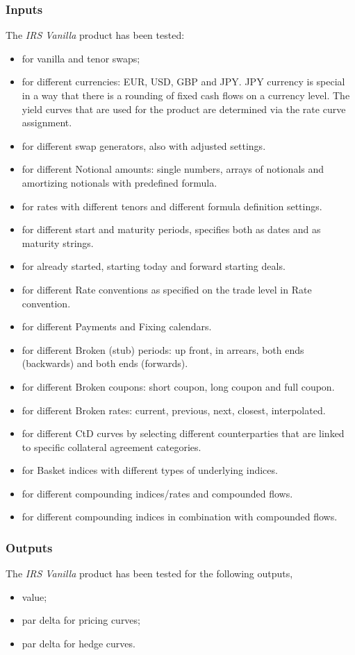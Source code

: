 \documentclass[]{pmv_report} %
\newcommand{\testsDone}{
    \begin{itemize}
        \item value;
        \item par delta for pricing curves;
        \item par delta for hedge curves.
    \end{itemize}
}
\begin{document}
\subsubsection{Inputs}
The \textit{IRS Vanilla} product has been tested:
\begin{itemize}
  \item for vanilla and tenor swaps;
  \item for different currencies: EUR, USD, GBP and JPY.
  JPY currency is special in a way that there is a rounding of fixed cash flows on a currency level.
  The yield curves that are used for the product are determined via the rate curve assignment.
  \item for different swap generators, also with adjusted settings.
  \item for different Notional amounts: single numbers, arrays of notionals and amortizing notionals with predefined formula.
  \item for \Libor rates with different tenors and different formula definition settings.
  \item for different start and maturity periods, specifies both as dates and as maturity strings.
  \item for already started, starting today and forward starting deals.
  \item for different Rate conventions as specified on the trade level in Rate convention.
  \item for different Payments and Fixing calendars.
  \item for different Broken (stub) periods: up front, in arrears, both ends (backwards) and both ends (forwards).
  \item for different Broken coupons: short coupon, long coupon and full coupon.
  \item for different Broken rates: current, previous, next, closest, interpolated.
  \item for different CtD curves by selecting different counterparties that are linked to specific collateral agreement categories.
\item for Basket indices with different types of underlying indices.
  \item for different compounding indices/rates and compounded flows.
  \item for different compounding indices in combination with compounded flows.
\end{itemize}

\subsubsection{Outputs}\label{sec:outputs}
The \textit{IRS Vanilla} product has been tested for the following outputs, \testsDone
\end{document}
